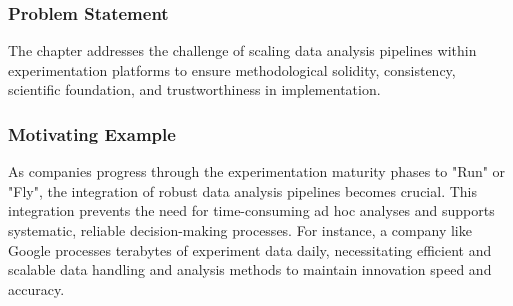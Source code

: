 \documentclass{article}
\begin{document}
\subsubsection*{Problem Statement}
The chapter addresses the challenge of scaling data analysis pipelines within experimentation platforms to ensure methodological solidity, consistency, scientific foundation, and trustworthiness in implementation.

\subsubsection*{Motivating Example}
As companies progress through the experimentation maturity phases to "Run" or "Fly", the integration of robust data analysis pipelines becomes crucial. This integration prevents the need for time-consuming ad hoc analyses and supports systematic, reliable decision-making processes. For instance, a company like Google processes terabytes of experiment data daily, necessitating efficient and scalable data handling and analysis methods to maintain innovation speed and accuracy.
\end{document}
